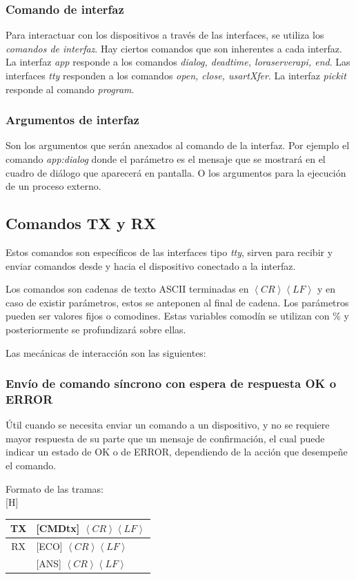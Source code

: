 \documentclass[a4paper,12pt]{refart}
\makeatletter
\renewenvironment{table}%
  {\renewcommand\familydefault\sfdefault
   \@float{table}}
  {\end@float}
\makeatother
\begin{document}
\subsubsection{Comando de interfaz}
Para interactuar con los dispositivos a través de las interfaces, se utiliza los \textit{comandos de interfaz}. Hay ciertos comandos que son inherentes a cada interfaz. La interfaz \textit{app} responde a los comandos \textit{dialog, deadtime, loraserverapi, end}. Las interfaces \textit{tty} responden a los comandos \textit{open, close, usartXfer}. La interfaz \textit{pickit} responde al comando \textit{program}.

\subsubsection{Argumentos de interfaz}
Son los argumentos que serán anexados al comando de la interfaz. Por ejemplo el comando \textit{app:dialog} donde el parámetro es el mensaje que se mostrará en el cuadro de diálogo que aparecerá en pantalla. O los argumentos para la ejecución de un proceso externo.

\subsection{Comandos TX y RX}
Estos comandos son específicos de las interfaces tipo \textit{tty}, sirven para recibir y enviar comandos desde y hacia el dispositivo conectado a la interfaz. 

Los comandos son cadenas de texto ASCII terminadas en $\left\langle CR \right\rangle \left\langle LF \right\rangle$ y en caso de existir parámetros, estos se anteponen al final de cadena. Los parámetros pueden ser valores fijos o comodines. Estas variables comodín se utilizan con \% y posteriormente se profundizará sobre ellas.

Las mecánicas de interacción son las siguientes:

\subsubsection{Envío de comando síncrono con espera de respuesta OK o ERROR}
Útil cuando se necesita enviar un comando a un dispositivo, y no se requiere mayor respuesta de su parte que un mensaje de confirmación, el cual puede indicar un estado de OK o de ERROR, dependiendo de la acción que desempeñe el comando.

Formato de las tramas:
\\
\begin{table}[H]
\small\centering
\begin{tabular}{|c|l|}
\hline 
TX & [CMDtx] $\left\langle CR \right\rangle \left\langle LF \right\rangle$ \\ 
\hline 
RX & [ECO] $\left\langle CR \right\rangle \left\langle LF \right\rangle$ \\
   & [ANS] $\left\langle CR \right\rangle \left\langle LF \right\rangle$ \\ 
\hline 
\end{tabular} 
\end{table}
\end{document}
